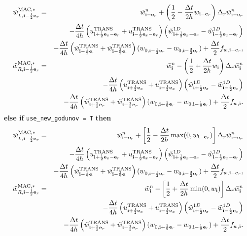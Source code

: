 \begin{eqnarray}
\tilde{w}_{L,{\bf i}-\frac{1}{2}{\bf e}_r}^{\rm MAC,*} &=& \tilde{w}_{{\bf i}-{\bf e}_r}^n + \left(\frac{1}{2} - \frac{\Delta t}{2h}w_{{\bf i}-{\bf e}_r}\right)\Delta_r \tilde{w}_{{\bf i}-{\bf e}_r}^n \nonumber \\
&& - \frac{\Delta t}{4h}\left(u_{{\bf i}+\frac{1}{2}{\bf e}_x-{\bf e}_r}^{\rm TRANS}+u_{{\bf i}-\frac{1}{2}{\bf e}_x-{\bf e}_r}^{\rm TRANS}\right)\left(\tilde{w}_{{\bf i}+\frac{1}{2}{\bf e}_x-{\bf e}_r}^{1D} - \tilde{w}_{{\bf i}-\frac{1}{2}{\bf e}_x-{\bf e}_r}^{1D}\right) \nonumber \\
&& - \frac{\Delta t}{4h}\left(\tilde{w}_{{\bf i}-\frac{1}{2}{\bf e}_r}^{\rm TRANS}+\tilde{w}_{{\bf i}-\frac{3}{2}{\bf e}_r}^{\rm TRANS}\right)(w_{0,{\bf i}-\frac{1}{2}{\bf e}_r} - w_{0,{\bf i}-\frac{3}{2}{\bf e}_r}) + \frac{\Delta t}{2}f_{w,{\bf i}-{\bf e}_r}, \\
\tilde{w}_{R,{\bf i}-\frac{1}{2}{\bf e}_r}^{\rm MAC,*} &=& \tilde{w}_{{\bf i}}^n - \left(\frac{1}{2} + \frac{\Delta t}{2h}w_{{\bf i}}\right)\Delta_r \tilde{w}_{{\bf i}}^n \nonumber \\
&& - \frac{\Delta t}{4h}\left(u_{{\bf i}+\frac{1}{2}{\bf e}_x}^{\rm TRANS}+u_{{\bf i}-\frac{1}{2}{\bf e}_x}^{\rm TRANS}\right)\left(\tilde{w}_{{\bf i}+\frac{1}{2}{\bf e}_x}^{1D} - \tilde{w}_{{\bf i}-\frac{1}{2}{\bf e}_x}^{1D}\right) \nonumber \\
&& - \frac{\Delta t}{4h}\left(\tilde{w}_{{\bf i}+\frac{1}{2}{\bf e}_r}^{\rm TRANS}+\tilde{w}_{{\bf i}-\frac{1}{2}{\bf e}_r}^{\rm TRANS}\right)(w_{0,{\bf i}+\frac{1}{2}{\bf e}_r} - w_{0,{\bf i}-\frac{1}{2}{\bf e}_r}) + \frac{\Delta t}{2}f_{w,{\bf i}}.
\end{eqnarray}
{\bf else if} {\tt use\_new\_godunov = T} {\bf then}
\begin{eqnarray}
\tilde{w}_{L,{\bf i}-\frac{1}{2}{\bf e}_r}^{\rm MAC,*} &=& \tilde{w}_{{\bf i}-{\bf e}_r}^n + \left[\frac{1}{2} - \frac{\Delta t}{2h}\max(0,w_{{\bf i}-{\bf e}_r})\right]\Delta_r \tilde{w}_{{\bf i}-{\bf e}_r}^n \nonumber \\
&& - \frac{\Delta t}{4h}\left(u_{{\bf i}+\frac{1}{2}{\bf e}_x-{\bf e}_r}^{\rm TRANS}+u_{{\bf i}-\frac{1}{2}{\bf e}_x-{\bf e}_r}^{\rm TRANS}\right)\left(\tilde{w}_{{\bf i}+\frac{1}{2}{\bf e}_x-{\bf e}_r}^{1D} - \tilde{w}_{{\bf i}-\frac{1}{2}{\bf e}_x-{\bf e}_r}^{1D}\right) \nonumber \\
&& - \frac{\Delta t}{4h}\left(\tilde{w}_{{\bf i}-\frac{1}{2}{\bf e}_r}^{\rm TRANS}+\tilde{w}_{{\bf i}-\frac{3}{2}{\bf e}_r}^{\rm TRANS}\right)(w_{0,{\bf i}-\frac{1}{2}{\bf e}_r} - w_{0,{\bf i}-\frac{3}{2}{\bf e}_r}) + \frac{\Delta t}{2}f_{w,{\bf i}-{\bf e}_r}, \\
\tilde{w}_{R,{\bf i}-\frac{1}{2}{\bf e}_r}^{\rm MAC,*} &=& \tilde{w}_{{\bf i}}^n - \left[\frac{1}{2} + \frac{\Delta t}{2h}\min(0,w_{{\bf i}})\right]\Delta_r \tilde{w}_{{\bf i}}^n \nonumber \\
&& - \frac{\Delta t}{4h}\left(u_{{\bf i}+\frac{1}{2}{\bf e}_x}^{\rm TRANS}+u_{{\bf i}-\frac{1}{2}{\bf e}_x}^{\rm TRANS}\right)\left(\tilde{w}_{{\bf i}+\frac{1}{2}{\bf e}_x}^{1D} - \tilde{w}_{{\bf i}-\frac{1}{2}{\bf e}_x}^{1D}\right) \nonumber \\
&& - \frac{\Delta t}{4h}\left(\tilde{w}_{{\bf i}+\frac{1}{2}{\bf e}_r}^{\rm TRANS}+\tilde{w}_{{\bf i}-\frac{1}{2}{\bf e}_r}^{\rm TRANS}\right)(w_{0,{\bf i}+\frac{1}{2}{\bf e}_r} - w_{0,{\bf i}-\frac{1}{2}{\bf e}_r}) + \frac{\Delta t}{2}f_{w,{\bf i}}.
\end{eqnarray}
